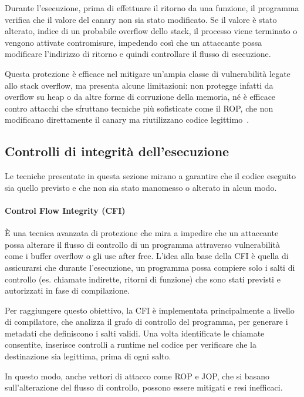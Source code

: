 Durante l'esecuzione, prima di effettuare il ritorno da una funzione, il programma
verifica che il valore del canary non sia stato modificato. Se il valore è stato
alterato, indice di un probabile overflow dello stack, il processo viene
terminato o vengono attivate contromisure, impedendo così che un attaccante possa
modificare l'indirizzo di ritorno e quindi controllare il flusso di esecuzione.

Questa protezione è efficace nel mitigare un'ampia classe di vulnerabilità legate
allo stack overflow, ma presenta alcune limitazioni: non protegge infatti da overflow
su heap o da altre forme di corruzione della memoria, né è efficace contro
attacchi che sfruttano tecniche più sofisticate come il ROP, che non modificano direttamente
il canary ma riutilizzano codice legittimo~\cite{stack_canaries}.

\subsection{Controlli di integrità dell'esecuzione}
\label{sec:execution-integrity} Le tecniche presentate in questa sezione mirano a
garantire che il codice eseguito sia quello previsto e che non sia stato manomesso
o alterato in alcun modo.

\paragraph{Control Flow Integrity (CFI)}
È una tecnica avanzata di protezione che mira a impedire che un attaccante possa
alterare il flusso di controllo di un programma attraverso vulnerabilità come i
buffer overflow o gli use after free. L'idea alla base della CFI è quella di assicurarsi
che durante l'esecuzione, un programma possa compiere solo i salti di controllo
(es. chiamate indirette, ritorni di funzione) che sono stati previsti e
autorizzati in fase di compilazione.

Per raggiungere questo obiettivo, la CFI è implementata principalmente a livello
di compilatore, che analizza il grafo di controllo del programma, per generare i
metadati che definiscono i salti validi. Una volta identificate le chiamate
consentite, inserisce controlli a runtime nel codice per verificare che la destinazione
sia legittima, prima di ogni salto.

In questo modo, anche vettori di attacco come ROP e JOP, che si basano sull'alterazione
del flusso di controllo, possono essere mitigati e resi inefficaci.

